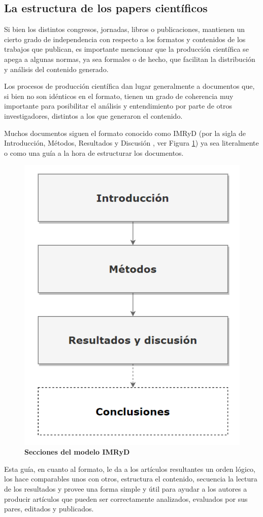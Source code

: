 \subsection{La estructura de los papers científicos}

Si bien los distintos congresos, jornadas, libros o publicaciones, mantienen un cierto grado de independencia con respecto a los formatos y contenidos de los trabajos que publican, es importante mencionar que la producción científica se apega a algunas normas, ya sea formales o de hecho, que facilitan la distribución y análisis del contenido generado.

Los procesos de producción científica dan lugar generalmente a documentos que, si bien no son idénticos en el formato, tienen un grado de coherencia muy importante para posibilitar el análisis y entendimiento por parte de otros investigadores, distintos a los que generaron el contenido.

Muchos documentos siguen el formato conocido como IMRyD (por la sigla de Introducción, Métodos, Resultados y Discusión \cite{del2007difusion}, ver Figura \ref{fig:imryd}) ya sea literalmente o como una guía a la hora de estructurar los documentos.

\begin{figure}[H]
	\centering
	\includegraphics[width=0.6\linewidth]{images/imryd}
	\caption{\textbf{Secciones del modelo IMRyD}}
	\label{fig:imryd}
\end{figure}

Esta guía, en cuanto al formato, le da a los artículos resultantes un orden lógico, los hace comparables unos con otros, estructura el contenido, secuencia la lectura de los resultados y provee una forma simple y útil para ayudar a los autores a producir artículos que pueden ser correctamente analizados, evaluados por sus pares, editados y publicados.

